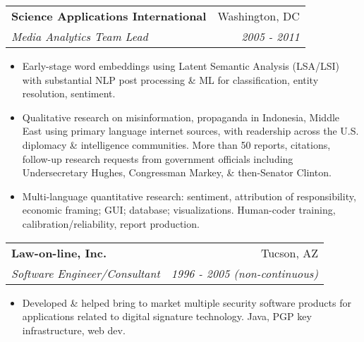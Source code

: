\documentclass[letterpaper,11pt]{article}
\makeatletter
\newcommand{\resitem}[1]{\item #1 \vspace{-6pt}}
\newcommand{\resheading}[1]{\vspace{4pt}{\large
\colorbox{mygrey}{\begin{minipage}{\textwidth}{\textbf{#1
\vphantom{p\^{E}}}}\end{minipage}}}\vspace{4pt}}
\newcommand{\ressubheading}[4]{\vspace{2pt}
\begin{tabular*}{7.58in}{l@{\extracolsep{\fill}}r}
		\textbf{#1} & #2 \\
		\textit{#3} & \textit{#4} \\
\end{tabular*}\vspace{-1pt}}
\makeatother
\begin{document}
\ressubheading{Science Applications International}{Washington, DC}{Media Analytics Team Lead}{2005 - 2011}
\begin{itemize}
\resitem{Early-stage word embeddings using Latent Semantic Analysis (LSA/LSI) with substantial NLP post processing \& ML for classification, entity resolution, sentiment.}
\resitem{Qualitative research on misinformation, propaganda in Indonesia, Middle East using primary language internet sources, with readership across the U.S. diplomacy \& intelligence communities. More than 50 reports, citations, follow-up research requests from government officials including Undersecretary Hughes, Congressman Markey, \& then-Senator Clinton.}
\resitem{Multi-language quantitative research: sentiment, attribution of responsibility, economic framing; GUI; database; visualizations.  Human-coder training, calibration/reliability, report production.}
\end{itemize} 



\ressubheading{Law-on-line, Inc.}{Tucson, AZ}{Software Engineer/Consultant}
{1996 - 2005 (non-continuous)}
\begin{itemize}
\resitem{Developed \& helped bring to market multiple security software products for 
applications related to digital signature technology. Java, PGP key infrastructure, web dev.}
\end{itemize}

\vspace{0.1in}



\resheading{Software}
 
\end{document}
